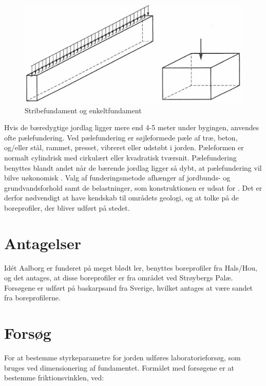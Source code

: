 \begin{figure}[htbp] \centering
	\begin{minipage}[b]{0.48\textwidth}\centering
		\includegraphics[width=1.0\textwidth]{billeder/fundament.png}
		\caption{Stribefundament og enkeltfundament \citep[ s. 221]{geoteknik}}
		\label{fig:fundament}
	\end{minipage}\hfill
\end{figure}

\indent{     }  Hvis de bæredygtige jordlag ligger mere end 4-5 meter under bygingen, anvendes ofte pælefundering. Ved pælefundering er søjleformede pæle af træ, beton, og/eller stål, rammet, presset, vibreret eller udstøbt i jorden. Pæleformen er normalt cylindrisk med cirkulært eller kvadratisk tværsnit. Pælefundering benyttes blandt andet når de bærende jordlag ligger så dybt, at pælefundering vil bilve uøkonomisk \citep[ s. 355]{geoteknik}.
\newline
\newline
Valg af funderingsmetode afhænger af jordbunds- og grundvandsforhold samt de belastninger, som konstruktionen er udsat for \citep[ s. 355]{geoteknik}. Det er derfor nødvendigt at have kendskab til områdets geologi, og at tolke på de boreprofiler, der bliver udført på stedet. 

\section{Antagelser}
Idét Aalborg er funderet på meget blødt ler, benyttes boreprofiler fra Hals/Hou, og det antages, at disse boreprofiler er fra området ved Strøybergs Palæ. 
\newline \indent{     }  Forsøgene er udført på baskarpsand fra Sverige, hvilket antages at være sandet fra boreprofilerne.

\section{Forsøg}
For at bestemme styrkeparametre for jorden udføres laboratorieforsøg, som bruges ved dimensionering af fundamentet.
\newline
\newline
Formålet med forsøgene er at bestemme friktionsvinklen, ved: 

